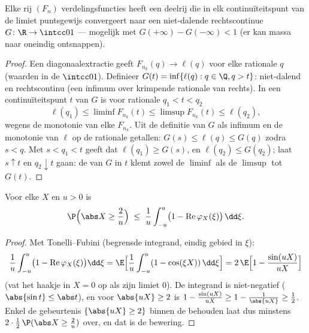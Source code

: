 \begin{theorem}
\label{thm:b3:clt:helly}
Elke rij $(F_n)$ verdelingsfuncties heeft een deelrij die in elk
continuïteitspunt van de limiet puntsgewijs convergeert naar een
niet-dalende rechtscontinue $G \colon \R \to \intcc01$ ---
mogelijk met $G(+\infty) - G(-\infty) < 1$ (er kan massa naar
oneindig ontsnappen).
\end{theorem}

\begin{proof}
Een diagonaalextractie geeft $F_{n_k}(q) \to \ell(q)$ voor elke
rationale $q$ (waarden in de  $\intcc01$). Definieer
$G(t) = \inf\{\ell(q) : q \in \Q, q > t\}$: niet-dalend en
rechtscontinu (een infimum over krimpende rationale 
van rechts). In een continuïteitspunt $t$ van $G$ is voor
rationale $q_1 < t < q_2$
\[
\ell(q_1) \leq \liminf F_{n_k}(t) \leq \limsup F_{n_k}(t)
\leq \ell(q_2),
\]
wegens de monotonie van elke $F_{n_k}$. Uit de definitie van $G$
als infimum en de monotonie van $\ell$ op de rationale getallen:
$G(s) \leq \ell(q) \leq G(q)$ zodra $s < q$. Met $s < q_1 < t$
geeft dat $\ell(q_1) \geq G(s)$, en $\ell(q_2) \leq G(q_2)$; laat
$s \uparrow t$ en $q_2 \downarrow t$ gaan: de  van
$G$ in $t$ klemt zowel de $\liminf$ als de $\limsup$ tot $G(t)$.
\end{proof}

\begin{lemma}
\label{lem:b3:clt:tightness}
Voor elke  $X$ en $u > 0$ is
\[
\P\Bigl(\abs X \geq \frac2u\Bigr) \;\leq\;
\frac1u\int_{-u}^{u}\bigl(1 -
\operatorname{Re}\varphi_X(\xi)\bigr)\,\dd\xi .
\]
\end{lemma}

\begin{proof}
Met Tonelli--Fubini (begrensde integrand, eindig gebied in
$\xi$):
\[
\frac1u\int_{-u}^u\bigl(1 -
\operatorname{Re}\varphi_X(\xi)\bigr)\dd\xi
= \E\Bigl[\frac1u\int_{-u}^u(1 - \cos(\xi X))\,\dd\xi\Bigr]
= 2\,\E\Bigl[1 - \frac{\sin(uX)}{uX}\Bigr]
\]
(vat het haakje in $X = 0$ op als zijn limiet $0$). De integrand
is niet-negatief ($\abs{\sin t} \leq \abs t$), en voor $\abs{uX}
\geq 2$ is $1 - \frac{\sin(uX)}{uX} \geq 1 - \frac1{\abs{uX}}
\geq \frac12$. Enkel de gebeurtenis $\{\abs{uX} \geq 2\}$ binnen
de  behouden laat dus minstens $2 \cdot
\frac12\,\P(\abs X \geq \frac2u)$ over, en dat is de bewering.
\end{proof}

